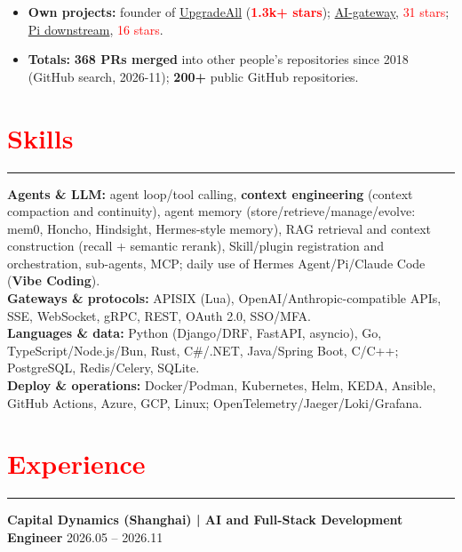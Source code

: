 \documentclass[10pt,a4paper]{article}
\begin{document}
\begin{itemize}
	\item \textbf{Own projects:} founder of \href{https://github.com/DUpdateSystem/UpgradeAll}{UpgradeAll} (\textbf{\textcolor{red}{1.3k+ stars}}); \href{https://github.com/xz-dev/AI-gateway}{AI-gateway}, \textcolor{red}{31 stars}; \href{https://github.com/xz-dev/pi}{Pi downstream}, \textcolor{red}{16 stars}.
	\item \textbf{Totals:} \textbf{368 PRs merged} into other people's repositories since 2018 (GitHub search, 2026-11); \textbf{200+} public GitHub repositories.
\end{itemize}

\section*{\textcolor{red}{Skills}}
\vspace*{-4ex}
\noindent\textcolor{red}{\rule{\linewidth}{0.4pt}}
\textbf{Agents \& LLM:} agent loop/tool calling, \textbf{context engineering} (context compaction and continuity), agent memory (store/retrieve/manage/evolve: mem0, Honcho, Hindsight, Hermes-style memory), RAG retrieval and context construction (recall + semantic rerank), Skill/plugin registration and orchestration, sub-agents, MCP; daily use of Hermes Agent/Pi/Claude Code (\textbf{Vibe Coding}).\\
\textbf{Gateways \& protocols:} APISIX (Lua), OpenAI/Anthropic-compatible APIs, SSE, WebSocket, gRPC, REST, OAuth 2.0, SSO/MFA.\\
\textbf{Languages \& data:} Python (Django/DRF, FastAPI, asyncio), Go, TypeScript/Node.js/Bun, Rust, C\#/.NET, Java/Spring Boot, C/C++; PostgreSQL, Redis/Celery, SQLite.\\
\textbf{Deploy \& operations:} Docker/Podman, Kubernetes, Helm, KEDA, Ansible, GitHub Actions, Azure, GCP, Linux; OpenTelemetry/Jaeger/Loki/Grafana.

\section*{\textcolor{red}{Experience}}
\vspace*{-4ex}
\noindent\textcolor{red}{\rule{\linewidth}{0.4pt}}
\textbf{Capital Dynamics (Shanghai) | AI and Full-Stack Development Engineer} \hfill 2026.05 -- 2026.11
\end{document}
